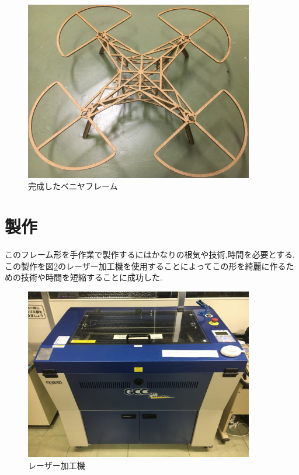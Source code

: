 \documentclass[12pt,oneside]{paper}
\begin{document}
\begin{figure}[H]
  \begin{center}
    \includegraphics[width=100mm]{ga/flame.jpg}
    \end{center}
  \caption{完成したベニヤフレーム}
 \label{fig:flame}
\end{figure}

\section{製作}このフレーム形を手作業で製作するにはかなりの根気や技術,時間を必要とする.この製作を図\ref{fig:laser}のレーザー加工機を使用することによってこの形を綺麗に作るための技術や時間を短縮することに成功した.

\begin{figure}[H]
  \begin{center}
    \includegraphics[width=100mm]{ga/laser.jpeg}
    \end{center}
  \caption{レーザー加工機}
 \label{fig:laser}
\end{figure}
\end{document}
